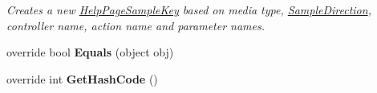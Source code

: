 \begin{DoxyCompactItemize}
\begin{DoxyCompactList}\small\item\em Creates a new \hyperlink{class__1aarsproeve_web_service_1_1_areas_1_1_help_page_1_1_help_page_sample_key}{Help\+Page\+Sample\+Key} based on media type, \hyperlink{class__1aarsproeve_web_service_1_1_areas_1_1_help_page_1_1_help_page_sample_key_a69980321c5a86fc11bbd2d4b3bca84ef}{Sample\+Direction}, controller name, action name and parameter names. \end{DoxyCompactList}\item 
\hypertarget{class__1aarsproeve_web_service_1_1_areas_1_1_help_page_1_1_help_page_sample_key_aae1ef0cce0c728c5b4b766b6cfb1a19f}{}override bool {\bfseries Equals} (object obj)\label{class__1aarsproeve_web_service_1_1_areas_1_1_help_page_1_1_help_page_sample_key_aae1ef0cce0c728c5b4b766b6cfb1a19f}

\item 
\hypertarget{class__1aarsproeve_web_service_1_1_areas_1_1_help_page_1_1_help_page_sample_key_ab15eabbf1156828a8f95e890cd9b8cca}{}override int {\bfseries Get\+Hash\+Code} ()\label{class__1aarsproeve_web_service_1_1_areas_1_1_help_page_1_1_help_page_sample_key_ab15eabbf1156828a8f95e890cd9b8cca}

\end{DoxyCompactItemize}
